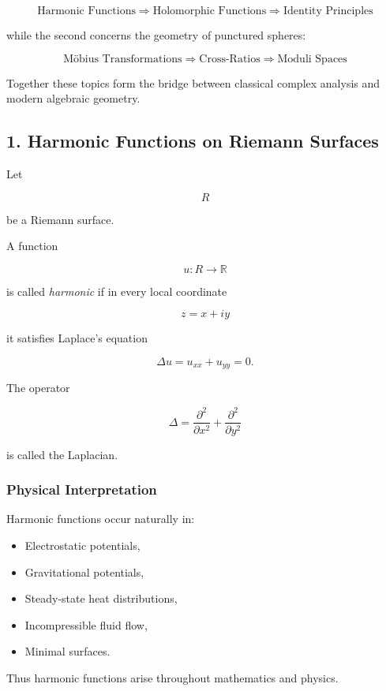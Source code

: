 \documentclass[12pt,a4paper]{article}
\theoremstyle{notespace}
\begin{document}
\[
\boxed{
	\text{Harmonic Functions}
	\Longrightarrow
	\text{Holomorphic Functions}
	\Longrightarrow
	\text{Identity Principles}
}
\]

while the second concerns the geometry of punctured spheres:

\[
\boxed{
	\text{Möbius Transformations}
	\Longrightarrow
	\text{Cross-Ratios}
	\Longrightarrow
	\text{Moduli Spaces}
}
\]

Together these topics form the bridge between classical complex analysis and modern algebraic geometry.

\bigskip

\subsection{1. Harmonic Functions on Riemann Surfaces}

Let

\[
R
\]

be a Riemann surface.

A function

\[
u:R\to\mathbb R
\]

is called \emph{harmonic} if in every local coordinate

\[
z=x+iy
\]

it satisfies Laplace's equation

\[
\Delta u
=
u_{xx}+u_{yy}
=
0.
\]

The operator

\[
\Delta
=
\frac{\partial^2}{\partial x^2}
+
\frac{\partial^2}{\partial y^2}
\]

is called the Laplacian.

\subsubsection*{Physical Interpretation}

Harmonic functions occur naturally in:

\begin{itemize}
	\item Electrostatic potentials,
	\item Gravitational potentials,
	\item Steady-state heat distributions,
	\item Incompressible fluid flow,
	\item Minimal surfaces.
\end{itemize}

Thus harmonic functions arise throughout mathematics and physics.
\end{document}
